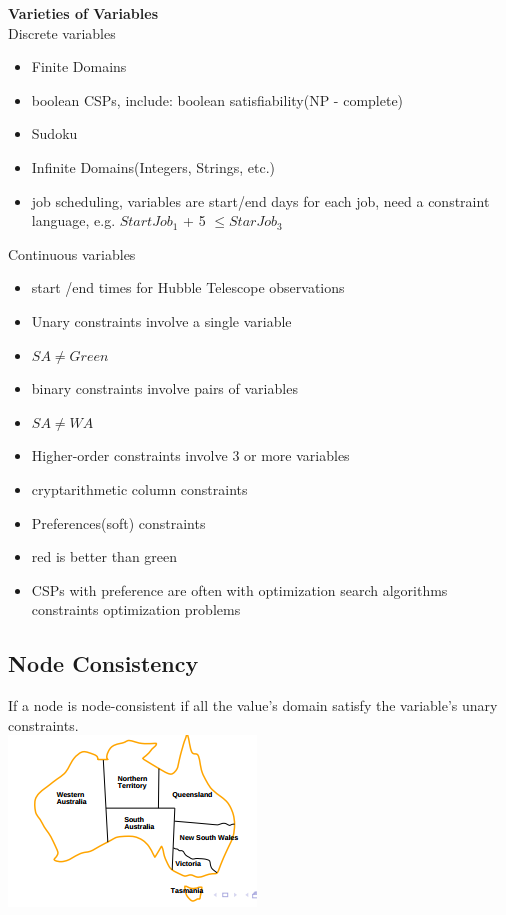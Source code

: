 \textbf{Varieties of Variables}\\
Discrete variables
\begin{itemize}
\item Finite Domains
\item boolean CSPs, include: boolean satisfiability(NP - complete)
\item Sudoku
\item Infinite Domains(Integers, Strings, etc.)

\item job scheduling, variables are start/end days for each job, need a constraint language, e.g. $StartJob_1$ + 5 $\leq  StarJob_3$
\end{itemize}
Continuous variables
\begin{itemize}
\item start /end times for Hubble Telescope observations
\item Unary constraints involve a single variable
\setlength{\itemindent}{3em}
\item $SA \neq Green$
\setlength{\itemindent}{0em}
\item binary constraints involve pairs of variables
\setlength{\itemindent}{3em}
\item $SA \neq WA$
\setlength{\itemindent}{0em}
\item Higher-order constraints involve 3 or more variables	
\setlength{\itemindent}{3em}
\item cryptarithmetic column constraints
\setlength{\itemindent}{0em}
\item Preferences(soft) constraints
\setlength{\itemindent}{3em}
\item red  is better than green
\item CSPs with preference are often with optimization search algorithms constraints optimization problems 
\end{itemize}


\subsection{Node Consistency}
If a node is node-consistent if all the value’s domain satisfy the variable’s unary constraints.\\[3ex]

\includegraphics[scale=1]{chap1_pics/austaliaareas.png} 

